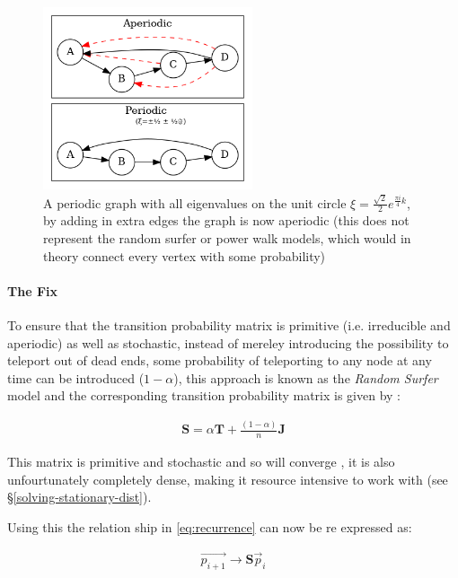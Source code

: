 \documentclass[11pt]{article}
\begin{document}
\begin{figure}
\includegraphics[width=0.55\textwidth]{media/dot/aperiodic.dot.png}
\caption{\label{fig:aperiodic}A periodic graph with all eigenvalues on the unit circle \(\xi = \frac{\sqrt{2}}{2} e^{\frac{\pi i}{4} k}\), by adding in extra edges the graph is now aperiodic (this does not represent the random surfer or power walk models, which would in theory connect every vertex with some probability)}
\end{figure}
\paragraph{The Fix}
\label{fix}
To ensure that the transition probability matrix is primitive (i.e. irreducible and aperiodic) as well as stochastic, instead of mereley introducing the possibility to teleport out of dead ends, some probability of teleporting to any node at any time can be introduced (\(1- \alpha\)), this approach is known as the \emph{Random Surfer} model and the corresponding transition probability matrix is given by \cite{larrypageAnatomyLargescaleHypertextual1998} :

\begin{align}
\mathbf{S} = \alpha \mathbf{T} + \frac{(1- \alpha)}{n} \mathbf{J} \label{eq:random-surfer}
\end{align}

This matrix is primitive and stochastic and so will converge
\cite[]{langvilleGooglePageRankScience2012}, it is also
unfourtunately completely dense, making it resource intensive to work with (see
\S \ref{solving-stationary-dist}).

Using this the relation ship in \eqref{eq:recurrence} can now be re
expressed as:

\begin{align}
\vec{p_{i+1}} \rightarrow \mathbf{S} \vec{p}_{i} \label{eq:random-surfer-recurrence}
\end{align}
\end{document}
